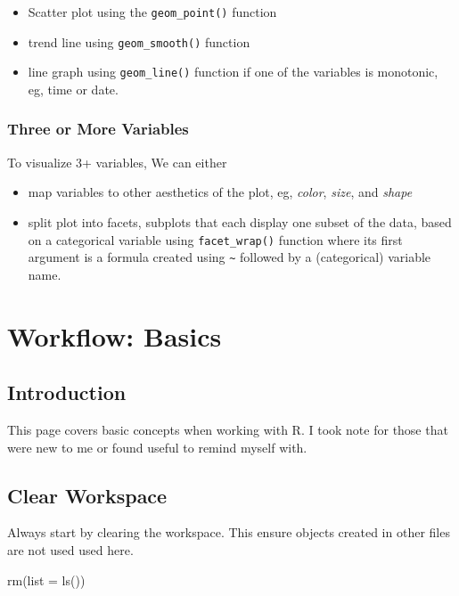 \documentclass[
  letterpaper,
  DIV=11,
  numbers=noendperiod]{scrreprt}
\newenvironment{Shaded}{\begin{snugshade}}{\end{snugshade}}
\newcommand{\AttributeTok}[1]{\textcolor[rgb]{0.40,0.45,0.13}{#1}}
\newcommand{\FunctionTok}[1]{\textcolor[rgb]{0.28,0.35,0.67}{#1}}
\newcommand{\NormalTok}[1]{\textcolor[rgb]{0.00,0.23,0.31}{#1}}
\providecommand{\tightlist}{%
  \setlength{\itemsep}{0pt}\setlength{\parskip}{0pt}}\usepackage{longtable,booktabs,array}
\begin{document}
\begin{itemize}
\tightlist
\item
  Scatter plot using the \texttt{geom\_point()} function
\item
  trend line using \texttt{geom\_smooth()} function
\item
  line graph using \texttt{geom\_line()} function if one of the
  variables is monotonic, eg, time or date.
\end{itemize}

\subsection{Three or More Variables}\label{three-or-more-variables}

To visualize 3+ variables, We can either

\begin{itemize}
\tightlist
\item
  map variables to other aesthetics of the plot, eg, \emph{color},
  \emph{size}, and \emph{shape}
\item
  split plot into facets, subplots that each display one subset of the
  data, based on a categorical variable using \texttt{facet\_wrap()}
  function where its first argument is a formula created using
  \texttt{\textasciitilde{}} followed by a (categorical) variable name.
\end{itemize}

\chapter{Workflow: Basics}\label{workflow-basics}

\section{Introduction}\label{introduction-1}

This page covers basic concepts when working with R. I took note for
those that were new to me or found useful to remind myself with.

\section{Clear Workspace}\label{clear-workspace-2}

Always start by clearing the workspace. This ensure objects created in
other files are not used used here.

\begin{Shaded}
\begin{Highlighting}[]
\FunctionTok{rm}\NormalTok{(}\AttributeTok{list =} \FunctionTok{ls}\NormalTok{())}
\end{Highlighting}
\end{Shaded}
\end{document}
